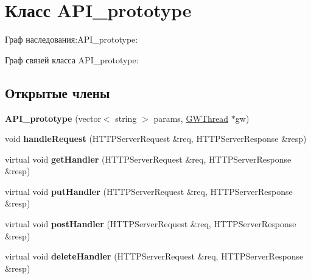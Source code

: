\hypertarget{classAPI__prototype}{}\section{Класс A\+P\+I\+\_\+prototype}
\label{classAPI__prototype}


Граф наследования\+:A\+P\+I\+\_\+prototype\+:


Граф связей класса A\+P\+I\+\_\+prototype\+:
\subsection*{Открытые члены}
\begin{DoxyCompactItemize}
\item 
\mbox{\label{classAPI__prototype_ae401addf467b05b0ff07413ae35527a3}} 
{\bfseries A\+P\+I\+\_\+prototype} (vector$<$ string $>$ params, \hyperlink{classGWThread}{G\+W\+Thread} $\ast$gw)
\item 
\mbox{\label{classAPI__prototype_acd9c34300f5bd7f9cda693fa10a58a25}} 
void {\bfseries handle\+Request} (H\+T\+T\+P\+Server\+Request \&req, H\+T\+T\+P\+Server\+Response \&resp)
\item 
\mbox{\label{classAPI__prototype_a29caed784df8b8ef3f58a8095f25664c}} 
virtual void {\bfseries get\+Handler} (H\+T\+T\+P\+Server\+Request \&req, H\+T\+T\+P\+Server\+Response \&resp)
\item 
\mbox{\label{classAPI__prototype_a8592dcb9bc1b4b3b5616ff3bd12cebcb}} 
virtual void {\bfseries put\+Handler} (H\+T\+T\+P\+Server\+Request \&req, H\+T\+T\+P\+Server\+Response \&resp)
\item 
\mbox{\label{classAPI__prototype_acb4cf5e75d681ad59f6852698d7a9efa}} 
virtual void {\bfseries post\+Handler} (H\+T\+T\+P\+Server\+Request \&req, H\+T\+T\+P\+Server\+Response \&resp)
\item 
\mbox{\label{classAPI__prototype_a66bbf0448edabf919dcf35ce1483f214}} 
virtual void {\bfseries delete\+Handler} (H\+T\+T\+P\+Server\+Request \&req, H\+T\+T\+P\+Server\+Response \&resp)
\item 
\mbox{\label{classAPI__prototype_a38af515a0bcb0647284ac220fe58d06a}} 

\end{DoxyCompactItemize}
